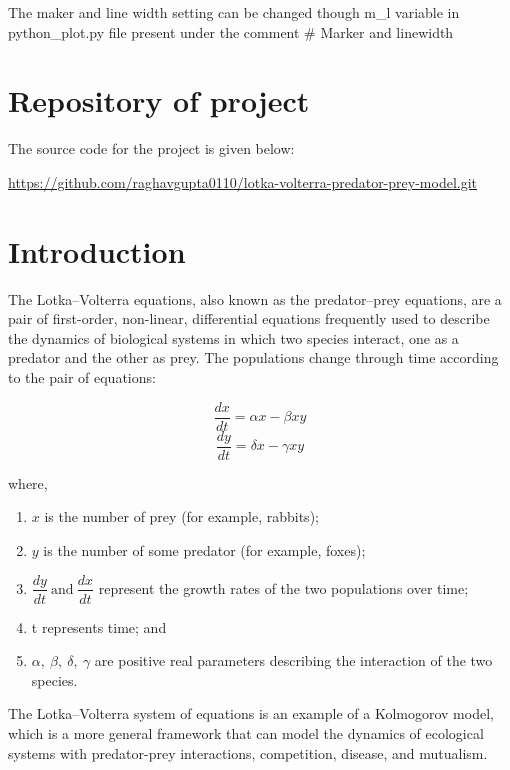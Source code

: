 \documentclass{article}
\begin{document}
The maker and line width setting can be changed though m\_l variable in python\_plot.py file present under the comment \# Marker and linewidth

\section{Repository of project}

The source code for the project is given below:

\noindent
\url{https://github.com/raghavgupta0110/lotka-volterra-predator-prey-model.git}

\section{Introduction}

The Lotka–Volterra equations, also known as the predator–prey equations, are a pair of first-order, non-linear, differential equations frequently used to describe the dynamics of biological systems in which two species interact, one as a predator and the other as prey. The populations change through time according to the pair of equations:

\begin{equation*}
\dfrac{dx}{dt} = \alpha x - \beta xy
\end{equation*}
\begin{equation*}
\dfrac{dy}{dt} = \delta x - \gamma xy
\end{equation*}

where,

\begin{enumerate}
\item $x$ is the number of prey (for example, rabbits);
\item $y$ is the number of some predator (for example, foxes);
\item $ \dfrac{dy}{dt} ~ \text{and} ~\dfrac{dx}{dt}$ represent the growth rates of the two populations over time;
\item t represents time; and
\item $\alpha , ~\beta , ~\delta , ~\gamma$ are positive real parameters describing the interaction of the two species.

\end{enumerate}

The Lotka–Volterra system of equations is an example of a Kolmogorov model,\cite{ref1}\cite{ref2}\cite{ref3} which is a more general framework that can model the dynamics of ecological systems with predator-prey interactions, competition, disease, and mutualism.
\end{document}
